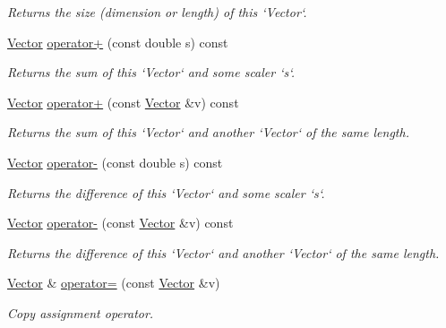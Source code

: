 \begin{DoxyCompactItemize}
\begin{DoxyCompactList}\small\item\em Returns the size (dimension or length) of this `Vector`. \item\end{DoxyCompactList}\item 
\hyperlink{classcs1730_1_1Vector}{Vector} \hyperlink{classcs1730_1_1Vector_a730dd3d4c20c41407ae908458a06181b}{operator+} (const double s) const 
\begin{DoxyCompactList}\small\item\em Returns the sum of this `Vector` and some scaler `s`. \item\end{DoxyCompactList}\item 
\hyperlink{classcs1730_1_1Vector}{Vector} \hyperlink{classcs1730_1_1Vector_a98369ba060b6c264b596ce30e7ad6b8d}{operator+} (const \hyperlink{classcs1730_1_1Vector}{Vector} \&v) const 
\begin{DoxyCompactList}\small\item\em Returns the sum of this `Vector` and another `Vector` of the same length. \item\end{DoxyCompactList}\item 
\hyperlink{classcs1730_1_1Vector}{Vector} \hyperlink{classcs1730_1_1Vector_a0f9928e0ee1dd9efaafd43a020dff3e8}{operator-\/} (const double s) const 
\begin{DoxyCompactList}\small\item\em Returns the difference of this `Vector` and some scaler `s`. \item\end{DoxyCompactList}\item 
\hyperlink{classcs1730_1_1Vector}{Vector} \hyperlink{classcs1730_1_1Vector_ac7b9814871af89597bd0888d7db966de}{operator-\/} (const \hyperlink{classcs1730_1_1Vector}{Vector} \&v) const 
\begin{DoxyCompactList}\small\item\em Returns the difference of this `Vector` and another `Vector` of the same length. \item\end{DoxyCompactList}\item 
\hyperlink{classcs1730_1_1Vector}{Vector} \& \hyperlink{classcs1730_1_1Vector_ae48c467a9f65d60e2f7455aba4ca1239}{operator=} (const \hyperlink{classcs1730_1_1Vector}{Vector} \&v)
\begin{DoxyCompactList}\small\item\em Copy assignment operator. \item\end{DoxyCompactList}\end{DoxyCompactItemize}
